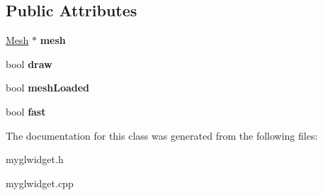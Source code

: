 \subsection*{Public Attributes}
\begin{DoxyCompactItemize}
\item 
\hypertarget{class_my_g_l_widget_ac9bc58377d5d84b9efd1f8152546e8ab}{\hyperlink{class_mesh}{Mesh} $\ast$ {\bfseries mesh}}\label{class_my_g_l_widget_ac9bc58377d5d84b9efd1f8152546e8ab}

\item 
\hypertarget{class_my_g_l_widget_a1d1b9a74ae13b12a9d3d7a57320dfcfb}{bool {\bfseries draw}}\label{class_my_g_l_widget_a1d1b9a74ae13b12a9d3d7a57320dfcfb}

\item 
\hypertarget{class_my_g_l_widget_ad4647b19a0090df21972768774ef97ec}{bool {\bfseries mesh\-Loaded}}\label{class_my_g_l_widget_ad4647b19a0090df21972768774ef97ec}

\item 
\hypertarget{class_my_g_l_widget_acaa241b2a2e5c53d325e64d8b3ccee9b}{bool {\bfseries fast}}\label{class_my_g_l_widget_acaa241b2a2e5c53d325e64d8b3ccee9b}

\end{DoxyCompactItemize}


The documentation for this class was generated from the following files\-:\begin{DoxyCompactItemize}
\item 
myglwidget.\-h\item 
myglwidget.\-cpp\end{DoxyCompactItemize}
